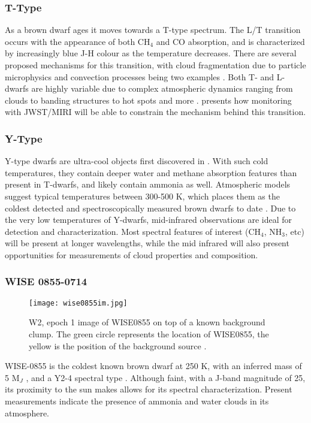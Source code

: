 \subsubsection{T-Type}
As a brown dwarf ages it moves towards a T-type spectrum. 
The L/T transition occurs  with the appearance of both CH$_{4}$ and CO absorption, and is characterized by increasingly blue J-H colour as the temperature decreases.
There are several proposed mechanisms for this transition, with cloud fragmentation due to particle microphysics \parencite{Burningham2017} and convection processes being two examples \parencite{Tremblin2015}.
Both T- and L-dwarfs are highly variable due to complex atmospheric dynamics ranging from clouds to banding structures to hot spots and more \parencite{Biller2017}.
\parencite{Vos2019} presents how monitoring with JWST/MIRI will be able to constrain the mechanism behind this transition.
\subsubsection{Y-Type}
Y-type dwarfs are ultra-cool objects first discovered in \parencite{Cushing2011}. 
With such cold temperatures, they contain deeper water and methane absorption features than present in T-dwarfs, and likely contain ammonia as well.
Atmospheric models suggest typical temperatures between 300-500 K, which places them as the coldest detected and spectroscopically measured brown dwarfs to date \parencite{Cushing2011}.
Due to the very low temperatures of Y-dwarfs, mid-infrared observations are ideal for detection and characterization.
Most spectral features of interest (CH$_{4}$, NH$_{3}$, etc) will be present at longer wavelengths, while the mid infrared will also present opportunities for measurements of cloud properties and composition.

\clearpage
\subsubsection{WISE 0855-0714}
\begin{wrapfigure}{r}{5.5cm}
	\centering
	\vspace{-1em}
	\texttt{[image: wise0855im.jpg]}
	\caption{W2, epoch 1 image of WISE0855 on top of a known background clump. The green circle represents the location of WISE0855, the yellow is the position of the background source \parencite{Wright2014}. }
	\label{fig:wise0855im}
\end{wrapfigure}
WISE-0855 is the coldest known brown dwarf at 250 K, with an inferred mass of 5 M$_{J}$ \parencite{Luhman2014}, and a Y2-4 spectral type \parencite{Leggett2015}.
Although faint, with a J-band magnitude of 25, its proximity to the sun makes allows for its spectral characterization.
Present measurements indicate the presence of ammonia \parencite{Leggett2015} and water clouds \parencite{Morley2014,Faherty2018} in its atmosphere.

